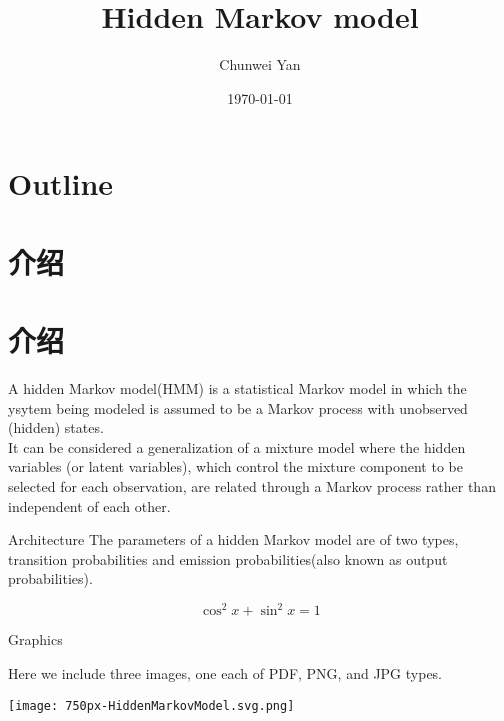 \documentclass{beamer}
\author{Chunwei Yan}
\title{Hidden Markov model}
\date{\today}
\begin{document}
\frame{\titlepage}
\section*{Outline} 
\section{介绍}
\frame{\tableofcontents}
\section{介绍}
A hidden Markov model(HMM) is a statistical Markov model in which the ysytem being modeled is assumed to be a Markov process with unobserved (hidden) states.\\
It can be considered a generalization of a mixture model where the hidden variables (or latent variables), which control the mixture component to be selected for each observation, are related through a Markov process rather than independent of each other.


\begin{frame}{Architecture} 
The parameters of a hidden Markov model are of two types, transition probabilities and emission probabilities(also known as output probabilities).
\begin{displaybox}{5cm}     %
\[ 
     \cos^2 x + \sin^2 x = 1 
 \] 
 \end{displaybox} 
\end{frame}



\begin{frame}{Graphics} 
 
 Here we include three images, one each of PDF, PNG, and JPG types. 
  
\begin{center} 
    \texttt{[image: 750px-HiddenMarkovModel.svg.png]} 
\end{center} 
\end{frame} 
\end{document}
